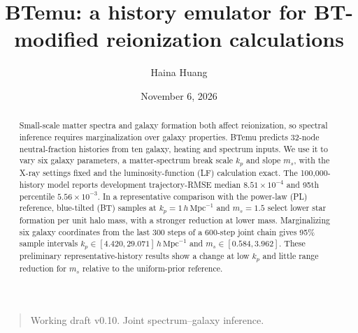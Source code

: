 \documentclass[reprint,superscriptaddress,nofootinbib,nobibnotes,amsmath,amssymb,aps,prd,floatfix,longbibliography]{revtex4-2}
\def\btemubody{body.tex}
\begin{document}
\title{BTemu: a history emulator for BT-modified reionization calculations}
\author{Haina Huang}
\date{November 6, 2026}
\begin{abstract}
Small-scale matter spectra and galaxy formation both affect reionization, so spectral inference requires marginalization over galaxy properties. BTemu predicts 32-node neutral-fraction histories from ten galaxy, heating and spectrum inputs. We use it to vary six galaxy parameters, a matter-spectrum break scale $k_p$ and slope $m_s$, with the X-ray settings fixed and the luminosity-function (LF) calculation exact. The 100,000-history model reports development trajectory-RMSE median $8.51\times10^{-4}$ and 95th percentile $5.56\times10^{-3}$. In a representative comparison with the power-law (PL) reference, blue-tilted (BT) samples at $k_p=1\,h\,\mathrm{Mpc}^{-1}$ and $m_s=1.5$ select lower star formation per unit halo mass, with a stronger reduction at lower mass. Marginalizing six galaxy coordinates from the last 300 steps of a 600-step joint chain gives 95\% sample intervals $k_p\in[4.420,29.071]\,h\,\mathrm{Mpc}^{-1}$ and $m_s\in[0.584,3.962]$. These preliminary representative-history results show a change at low $k_p$ and little range reduction for $m_s$ relative to the uniform-prior reference.
\end{abstract}
\maketitle
\begin{quote}\small Working draft v0.10. Joint spectrum--galaxy inference.\end{quote}

\end{document}
